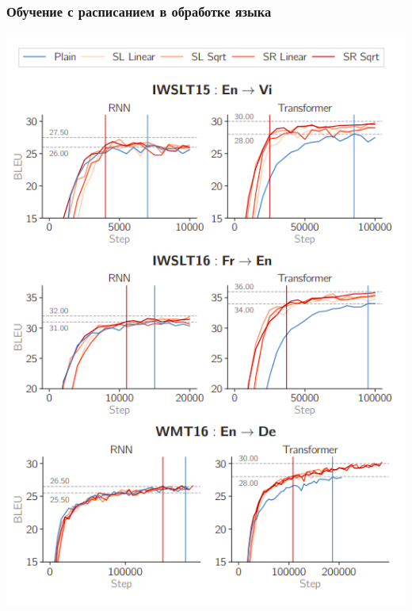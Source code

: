 \documentclass{beamer}
\begin{document}
\begin{frame}
	\frametitle{Обучение с расписанием в обработке языка}
	\begin{center}
		\includegraphics[scale=0.3]{acl19_results}
	\end{center}
\end{frame}
\end{document}
